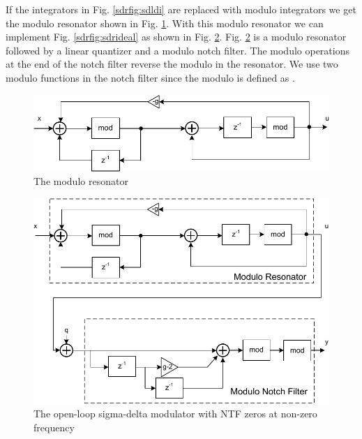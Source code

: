 If the 
integrators in Fig. \ref{sdrfig:sdldi} are replaced with modulo integrators
we get the modulo resonator shown in
Fig. \ref{sdrfig:sdr_ldi}.  With this modulo resonator 
we can implement Fig. \ref{sdrfig:sdrideal} as shown in
Fig. \ref{sdrfig:sdr_mod}. Fig. \ref{sdrfig:sdr_mod} is a modulo resonator followed by a
linear quantizer and a modulo
notch filter. The modulo operations at the end of the notch filter
reverse the modulo in the resonator. We use two modulo functions in
the notch filter since the modulo is defined as  .


\begin{figure}[htbp]
\centerline{ \includegraphics[width=\myfigwidth]{graphics/sdr_ldi}}
  \caption{The modulo resonator }
  \label{sdrfig:sdr_ldi}
\end{figure}

\begin{figure}[htbp]
\centerline{ \includegraphics[width=\myfigwidth]{graphics/sdr_mod}}
  \caption{The open-loop sigma-delta modulator with NTF zeros at
    non-zero frequency}
  \label{sdrfig:sdr_mod}
\end{figure}


